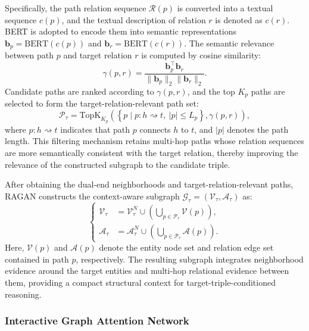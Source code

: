 \documentclass[a4paper,fleqn]{cas-sc}
\begin{document}
Specifically, the path relation sequence $\mathcal{R}(p)$ is converted into a textual sequence $c(p)$, and the textual description of relation $r$ is denoted as $c(r)$. BERT is adopted to encode them into semantic representations $\mathbf{b}_{p}=\mathrm{BERT}(c(p))$ and $\mathbf{b}_{r}=\mathrm{BERT}(c(r))$. The semantic relevance between path $p$ and target relation $r$ is computed by cosine similarity:
\begin{equation}
\gamma(p,r)
=
\frac{
\mathbf{b}_{p}^{\top}\mathbf{b}_{r}
}{
\|\mathbf{b}_{p}\|_{2}\|\mathbf{b}_{r}\|_{2}
}.
\end{equation}
Candidate paths are ranked according to $\gamma(p,r)$, and the top $K_p$ paths are selected to form the target-relation-relevant path set:
\begin{equation}
\mathcal{P}_{\tau}
=
\mathrm{TopK}_{K_p}
\left(
\left\{
p
\mid
p:h\rightsquigarrow t,\ |p|\leq L_p
\right\},
\gamma(p,r)
\right),
\end{equation}
where $p:h\rightsquigarrow t$ indicates that path $p$ connects $h$ to $t$, and $|p|$ denotes the path length. This filtering mechanism retains multi-hop paths whose relation sequences are more semantically consistent with the target relation, thereby improving the relevance of the constructed subgraph to the candidate triple.

After obtaining the dual-end neighborhoods and target-relation-relevant paths, RAGAN constructs the context-aware subgraph $\mathcal{G}_{\tau}=(\mathcal{V}_{\tau},\mathcal{A}_{\tau})$ as:
\begin{equation}
\left\{
\begin{aligned}
\mathcal{V}_{\tau}
&=
\mathcal{V}_{\tau}^{N}
\cup
\left(
\bigcup_{p\in\mathcal{P}_{\tau}}
\mathcal{V}(p)
\right), \\
\mathcal{A}_{\tau}
&=
\mathcal{A}_{\tau}^{N}
\cup
\left(
\bigcup_{p\in\mathcal{P}_{\tau}}
\mathcal{A}(p)
\right).
\end{aligned}
\right.
\end{equation}
Here, $\mathcal{V}(p)$ and $\mathcal{A}(p)$ denote the entity node set and relation edge set contained in path $p$, respectively. The resulting subgraph integrates neighborhood evidence around the target entities and multi-hop relational evidence between them, providing a compact structural context for target-triple-conditioned reasoning.

\subsubsection{Interactive Graph Attention Network}
\end{document}
